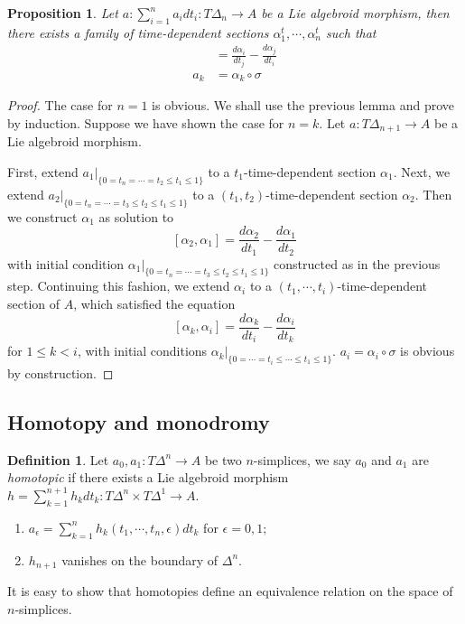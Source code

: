 \documentclass[12pt]{amsart}
\newtheorem{prop}[thm]{Proposition}
\theoremstyle{definition}
\newtheorem{defn}[thm]{Definition}
\theoremstyle{remark}
\numberwithin{equation}{section}
\newcommand{\1}{{\mathbb{1}}}
\begin{document}
\begin{prop}
Let $a: \sum_{i=1}^n a_i dt_i: T\Delta_n \to A$ be a Lie algebroid morphism, then there exists a family of time-dependent sections $\alpha^t_1, \cdots, \alpha^t_n$ such that
\begin{align*}
    [\alpha_i, \alpha_j] &= \frac{d \alpha_i}{d t_j} - \frac{d \alpha_j}{d t_i}\\
    a_k &= \alpha_k \circ \sigma
\end{align*}
\end{prop}
\begin{proof}
The case for $n = 1$ is obvious. We shall use the previous lemma and prove by induction. Suppose we have shown the case for $n = k$. Let $a: T \Delta_{n+1} \to A$ be a Lie algebroid morphism.    

First, extend $a_1|_{\{0 = t_n = \cdots = t_2 \le t_1 \le 1\}}$ to a $t_1$-time-dependent section $\alpha_1$. Next, we extend $a_2|_{\{0 = t_n = \cdots = t_3 \le t_2 \le t_1 \le 1\} }$ to a $(t_1, t_2)$-time-dependent section $\alpha_2$. Then we construct $\alpha_1$ as solution to 
    $$
    [\alpha_2, \alpha_1] = \frac{d \alpha_2}{d t_1} - \frac{d \alpha_1}{d t_2}
    $$
    with initial condition $\alpha_1|_{\{0 = t_n = \cdots = t_3 \le t_2 \le t_1 \le 1\}}$ constructed as in the previous step. Continuing this fashion, we extend $\alpha_i$ to a $(t_1,\cdots, t_i)$-time-dependent section of $A$, which satisfied the equation
    $$
    [\alpha_k, \alpha_i] = \frac{d \alpha_k}{d t_i} - \frac{d \alpha_i}{d t_k}
    $$
    for $1\le k <i$, with initial conditions $\alpha_k|_{\{0 = \cdots = t_{i} \le \cdots \le t_1 \le 1\}} $. $a_i = \alpha_i \circ \sigma$ is obvious by construction.
\end{proof}

\subsection{Homotopy and monodromy}

\begin{defn}
    Let $a_0, a_1: T\Delta^n \to A$ be two $n$-simplices, we say $a_0$ and $a_1$ are {\it homotopic} if there exists a Lie algebroid morphism $h = \sum_{k=1}^{n+1} h_k dt_k: T\Delta^{n}\times T\Delta^1 \to A$.
    
    
    
    \begin{enumerate}
        \item $a_{\epsilon}= \sum_{k=1}^{n} h_k(t_1, \cdots, t_n, \epsilon) dt_k$ for $\epsilon = 0, 1;$
        \item $h_{n+1}$ vanishes on the boundary of $\Delta^n$.
    \end{enumerate}
    It is easy to show that homotopies define an equivalence relation on the space of $n$-simplices.
\end{defn}
\end{document}

